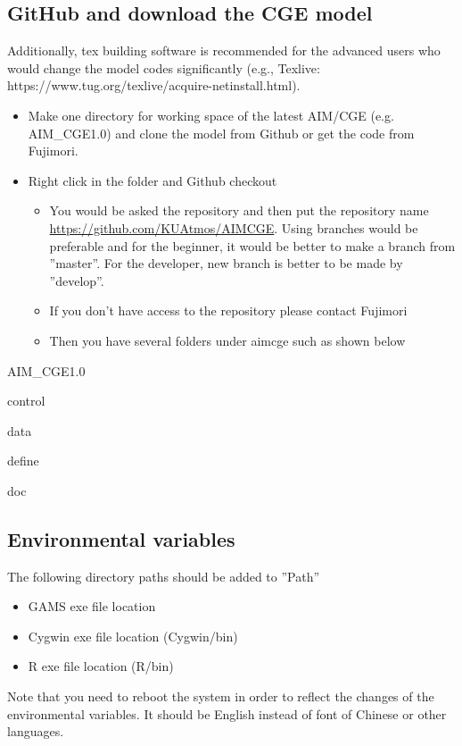 \documentclass[10pt,a4paper,titlepage,dvipdfmx]{book}
\begin{document}
\subsection{\label{subsec:GitCGE}GitHub and download the CGE model}

Additionally, tex building software is recommended for the advanced users who would change the model codes significantly (e.g., Texlive: https://www.tug.org/texlive/acquire-netinstall.html).


\begin{itemize}
\item Make one directory for working space of the latest AIM/CGE (e.g. AIM\_CGE1.0) and clone the model from Github or get the code from Fujimori. 
\item Right click in the folder and Github checkout
\begin{itemize}
\item You would be asked the repository and then put the repository name \url{https://github.com/KUAtmos/AIMCGE}. Using branches would be preferable and for the beginner, it would be better to make a branch from ''master''. For the developer, new branch is better to be made by ''develop''.
\item If you don't have access to the repository please contact Fujimori
\item Then you have several folders under aimcge such as shown below
\end{itemize}

\end{itemize}
AIM\_CGE1.0

   {\textbar}control

   {\textbar}data

   {\textbar}define

   {\textbar}doc

   {\textbar}

\subsection{\label{sub:EnvVar}Environmental variables}

The following directory paths should be added to ''Path''
\begin{itemize}
\item GAMS exe file location
\item Cygwin exe file location (Cygwin/bin)
\item R exe file location (R/bin)
\end{itemize}
Note that you need to reboot the system in order to reflect the changes of the environmental variables. It should be English instead of font of Chinese or other languages.
\end{document}
